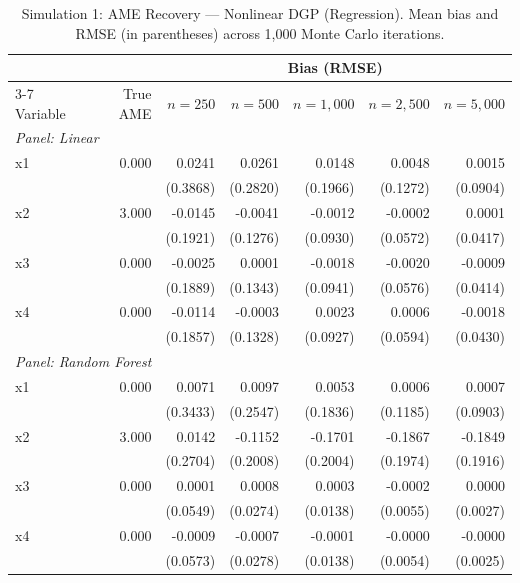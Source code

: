\documentclass[12pt,a4paper]{article}
\numberwithin{equation}{section}
\theoremstyle{plain}
\theoremstyle{definition}
\begin{document}
	\begin{table}[htbp]
		\centering
		\small
		\begin{threeparttable}
			\caption{Simulation 1: AME Recovery --- Nonlinear DGP (Regression). Mean bias and RMSE (in parentheses) across 1,000 Monte Carlo iterations.}
			\label{tab:sim1_regression_nonlinear}
			\begin{tabular}{lrrrrrr}
				\toprule
				& & \multicolumn{5}{c}{Bias (RMSE)} \\
				\cmidrule(lr){3-7}
				Variable & True AME & $n=250$ & $n=500$ & $n=1,000$ & $n=2,500$ & $n=5,000$ \\
				\midrule
				\multicolumn{7}{l}{\textit{Panel: Linear}} \\
				\quad x1 & 0.000 & 0.0241 & 0.0261 & 0.0148 & 0.0048 & 0.0015 \\
				&  & (0.3868) & (0.2820) & (0.1966) & (0.1272) & (0.0904) \\
				\quad x2 & 3.000 & -0.0145 & -0.0041 & -0.0012 & -0.0002 & 0.0001 \\
				&  & (0.1921) & (0.1276) & (0.0930) & (0.0572) & (0.0417) \\
				\quad x3 & 0.000 & -0.0025 & 0.0001 & -0.0018 & -0.0020 & -0.0009 \\
				&  & (0.1889) & (0.1343) & (0.0941) & (0.0576) & (0.0414) \\
				\quad x4 & 0.000 & -0.0114 & -0.0003 & 0.0023 & 0.0006 & -0.0018 \\
				&  & (0.1857) & (0.1328) & (0.0927) & (0.0594) & (0.0430) \\
				\midrule
				\multicolumn{7}{l}{\textit{Panel: Random Forest}} \\
				\quad x1 & 0.000 & 0.0071 & 0.0097 & 0.0053 & 0.0006 & 0.0007 \\
				&  & (0.3433) & (0.2547) & (0.1836) & (0.1185) & (0.0903) \\
				\quad x2 & 3.000 & 0.0142 & -0.1152 & -0.1701 & -0.1867 & -0.1849 \\
				&  & (0.2704) & (0.2008) & (0.2004) & (0.1974) & (0.1916) \\
				\quad x3 & 0.000 & 0.0001 & 0.0008 & 0.0003 & -0.0002 & 0.0000 \\
				&  & (0.0549) & (0.0274) & (0.0138) & (0.0055) & (0.0027) \\
				\quad x4 & 0.000 & -0.0009 & -0.0007 & -0.0001 & -0.0000 & -0.0000 \\
				&  & (0.0573) & (0.0278) & (0.0138) & (0.0054) & (0.0025) \\
				\midrule

\end{tabular}
\end{threeparttable}
\end{table}
\end{document}
